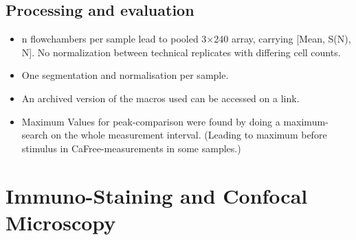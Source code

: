


\subsection{Processing and evaluation}

\begin{itemize}
\item n flowchambers per sample lead to pooled 3$\times$240 array, carrying [Mean, S(N), N]. No normalization between technical replicates with differing cell counts. 
\item One segmentation and normalisation per sample.
\item An archived version of the macros used can be accessed on a link.
\item Maximum Values for peak-comparison were found by doing a maximum-search on the whole measurement interval. (Leading to maximum before stimulus in CaFree-measurements in some samples.)
\end{itemize}


\section{Immuno-Staining and Confocal Microscopy}

